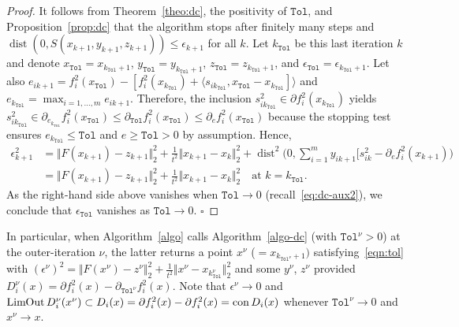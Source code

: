 \documentclass[smallextended,envcountsect]{svjour3}
\newcommand{\norm}[1]{\textstyle{\Vert} #1 \textstyle{\Vert}_2}
\newcommand{\col}[1]{\left\{#1\right\}}
\newcommand{\tol}{\texttt{Tol}}
\newcommand{\inner}[2]{\langle#1,#2\rangle}
\newcommand{\mybox}{{\hfill $\square$}}
\newcommand{\nats}{\mathbb{N}}
\newcommand{\nOutLim}{\mathop{\rm Lim\hspace{-0.01cm}Out}\nolimits}
\DeclareMathOperator{\con}{con}
\DeclareMathOperator{\dist}{dist}
\begin{document}
 \begin{proof}
It follows from Theorem~\ref{theo:dc}, the positivity of $\tol$, and Proposition~\ref{prop:dc} that the algorithm stops after finitely many steps and $\dist(0,S(x_{k+1},y_{k+1},z_{k+1}))\leq \epsilon_{k+1}$ for all $k$. %
Let $k_{\tol}$ be this last iteration $k$ and denote
$ x_\tol=x_{k_\tol+1}$, $ y_\tol=y_{k_\tol+1}$, $ z_\tol=z_{k_\tol+1}$,  and $\epsilon_{\tol}= \epsilon_{k_{\tol}+1} $.
Let also $e_{ik+1}= f_i^2(x_{\tol}) - [f_i^2(x_{k_\tol})+\inner{s_{ik_\tol}}{x_{\tol}-x_{k_\tol}]}$ and $e_{k_\tol}=\max_{i=1,\ldots,m} e_{ik+1}$.  Therefore, the inclusion $s_{ik_\tol}^2 \in \partial f_i^2(x_{k_\tol})$ yields $s_{ik_\tol}^2 \in  \partial_{e_{k_\tol}} f_i^2(x_{\tol})\leq \partial_{\tol} f_i^2(x_{\tol})\leq \partial_{e} f_i^2(x_{\tol})$ because the stopping test ensures  $e_{k_\tol}\leq \tol$ and $e\geq \tol>0$ by assumption.
Hence, 
\begin{align*}
\epsilon_{k+1}^2 & =  \norm{F(x_{k+1})-z_{k+1}}^2+\frac{1}{t^2}\norm{x_{k+1}-x_k}^2+\dist^2\Big(0,\sum_{i=1}^my_{ik+1}[s^2_{ik} -\partial_{e} f^2_i(x_{k+1})\Big)\\
&= \norm{F(x_{k+1})-z_{k+1}}^2+\frac{1}{t^2}\norm{x_{k+1}-x_k}^2 \quad \mbox{at $k=k_\tol$.}
\end{align*}
As the right-hand side above vanishes when $\tol\to 0$ (recall~\eqref{eq:dc-aux2}), we conclude that $\epsilon_\tol$ vanishes as $\tol \to 0$. 
   \mybox
\end{proof}

In particular, when  Algorithm~\ref{algo} calls Algorithm~\ref{algo-dc} (with $\tol^\nu>0$) at the outer-iteration $\nu$, the latter returns a point $x^\nu$ ($=x_{k_{\tol^\nu}+1})$ satisfying~\eqref{eqn:tol} with  $(\epsilon^\nu)^2={\norm{F(x^\nu)-z^\nu}^2+\frac{1}{t^2}\norm{x^\nu-x_{k_\tol^\nu}}^2}$ and some $y^\nu$, $z^\nu$ provided $D^\nu_i(x)=\partial f^2_i(x)-\partial_{\tol^\nu} f^2_i(x)$. Note that $\epsilon^\nu \to 0$ and $\nOutLim D^\nu_i(x^\nu) \subset D_i(x) = \partial f^2_i(x)-\partial f^2_i(x)=\con D_i(x)$ whenever $\tol^\nu \to 0$ and $x^\nu\to x$.
\end{document}

